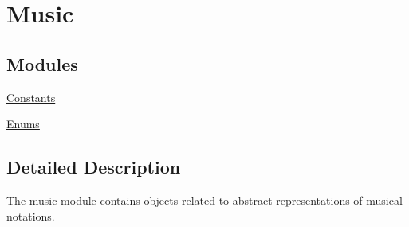 \hypertarget{group___music}{}\section{Music}
\label{group___music}
\subsection*{Modules}
\begin{DoxyCompactItemize}
\item 
\hyperlink{group___constants}{Constants}
\item 
\hyperlink{group___enums}{Enums}
\end{DoxyCompactItemize}


\subsection{Detailed Description}
The music module contains objects related to abstract representations of musical notations. 